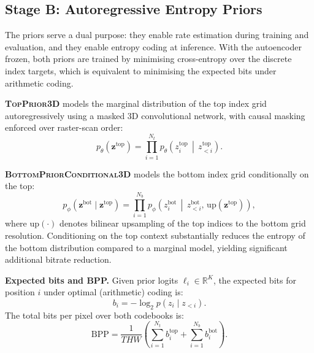 \documentclass[sigconf, screen, review, anonymous]{acmart}
\begin{document}
\subsection{Stage B: Autoregressive Entropy Priors}
\label{sec:priors}

The priors serve a dual purpose: they enable rate estimation during
training and evaluation, and they enable entropy coding at inference.
With the autoencoder frozen, both priors are trained by minimising
cross-entropy over the discrete index targets, which is equivalent to
minimising the expected bits under arithmetic coding.

\noindent\textbf{\textsc{TopPrior3D}} models the marginal distribution
of the top index grid autoregressively using a masked 3D convolutional
network, with causal masking enforced over raster-scan order:
\begin{equation}
  p_\theta(\mathbf{z}^\text{top})
    = \prod_{i=1}^{N_t}
      p_\theta\!\left(z^\text{top}_i \,\middle|\, z^\text{top}_{<i}\right).
  \label{eq:top_prior}
\end{equation}

\noindent\textbf{\textsc{BottomPriorConditional3D}} models the bottom
index grid conditionally on the top:
\begin{equation}
  p_\phi(\mathbf{z}^\text{bot} \mid \mathbf{z}^\text{top})
    = \prod_{i=1}^{N_b}
      p_\phi\!\left(z^\text{bot}_i \,\middle|\,
        z^\text{bot}_{<i},\, \mathrm{up}(\mathbf{z}^\text{top})\right),
  \label{eq:bot_prior}
\end{equation}
where $\mathrm{up}(\cdot)$ denotes bilinear upsampling of the top
indices to the bottom grid resolution. Conditioning on the top context
substantially reduces the entropy of the bottom distribution compared
to a marginal model, yielding significant additional bitrate reduction.

\noindent\textbf{Expected bits and BPP.} Given prior logits
$\boldsymbol{\ell}_i \in \mathbb{R}^K$, the expected bits for position
$i$ under optimal (arithmetic) coding is:
\begin{equation}
  b_i = -\log_2 p(z_i \mid z_{<i}).
  \label{eq:bits}
\end{equation}
The total bits per pixel over both codebooks is:
\begin{equation}
  \mathrm{BPP} = \frac{1}{THW}
    \left(\sum_{i=1}^{N_t} b^\text{top}_i
        + \sum_{i=1}^{N_b} b^\text{bot}_i\right).
  \label{eq:bpp}
\end{equation}
\end{document}
